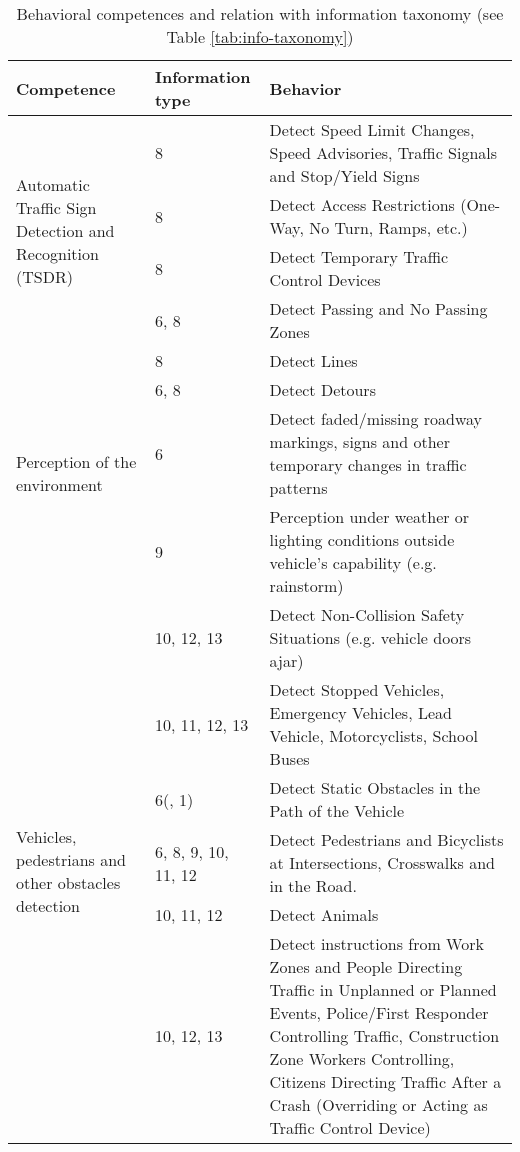 \begin{table*}[t] %
    \caption{Behavioral competences and relation with information taxonomy 
        (see Table \ref{tab:info-taxonomy})}
    \label{tab:behavioral-competences}
    \begin{tabular*}{\textwidth}{m{4cm} l p{11cm}}%
        \hline %
        \textbf{Competence}	& \textbf{Information type} & \textbf{Behavior}	
        \\
        \hline %
        \multirow{4}{4cm}{Automatic Traffic Sign Detection
            and Recognition (TSDR)}
        & 8    & Detect Speed Limit Changes, Speed Advisories, Traffic Signals 
        and Stop/Yield Signs \\
        & 8    & Detect Access Restrictions (One-Way, No Turn, Ramps, etc.) \\
        & 8    & Detect Temporary Traffic Control Devices \\
        & 6, 8 & Detect Passing and No Passing Zones  \\
        \hline %
        \multirow{4}{*}{Perception of the environment}
        & 8 & Detect Lines \\
        & 6, 8 & Detect Detours  \\
        & 6 & Detect faded/missing roadway markings, signs and other 
        temporary changes in traffic patterns \\
        & 9 & Perception under weather or lighting conditions 
        outside 
        vehicle’s capability (e.g. rainstorm) \\
        \hline %
        \multirow{6}{4cm}{Vehicles, pedestrians and other obstacles 
            detection}
        & 10, 12, 13 & Detect Non-Collision Safety Situations (e.g. vehicle 
        doors ajar) \\
        & 10, 11, 12, 13 & Detect Stopped Vehicles, Emergency Vehicles, Lead 
        Vehicle, Motorcyclists, School Buses \\
        & 6(, 1)  & Detect Static Obstacles in the Path of the Vehicle \\
        & 6, 8, 9, 10, 11, 12 & Detect Pedestrians and Bicyclists at 
        Intersections, Crosswalks and in the Road. \\
        & 10, 11, 12 & Detect Animals \\
        & 10, 12, 13 & Detect instructions from Work Zones and People 
        Directing Traffic in Unplanned or Planned Events, Police/First 
        Responder Controlling Traffic, Construction Zone Workers Controlling, 
        Citizens Directing Traffic After a Crash (Overriding or Acting as 
        Traffic Control Device) \\
        
        \hline %
    \end{tabular*}
\end{table*}

